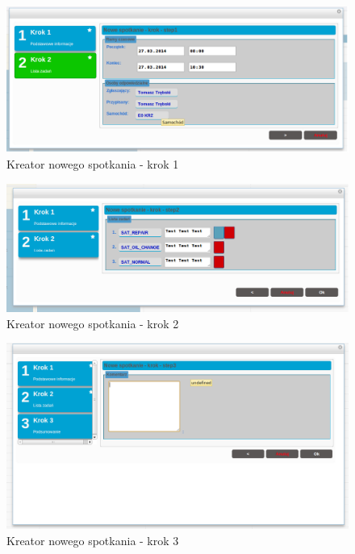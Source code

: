 	\begin{figure}[H]
		\centering
		\includegraphics[width=1.0\textwidth]{images/newAppointment_step1}
		\caption[Kreator nowego spotkania - krok 1]{
			Kreator nowego spotkania - krok 1
		}
		\label{app:wizard_newAppointment_step1}
	\end{figure}
	\begin{figure}[H]
		\centering
		\includegraphics[width=1.0\textwidth]{images/newAppointment_step2}
		\caption[Kreator nowego spotkania - krok 2]{
			Kreator nowego spotkania - krok 2
		}
		\label{app:wizard_newAppointment_step2}
	\end{figure}
	\begin{figure}[H]
		\centering
		\includegraphics[width=1.0\textwidth]{images/newAppointment_step3}
		\caption[Kreator nowego spotkania - krok 3]{
			Kreator nowego spotkania - krok 3
		}
		\label{app:wizard_newAppointment_step3}
	\end{figure}		
	
